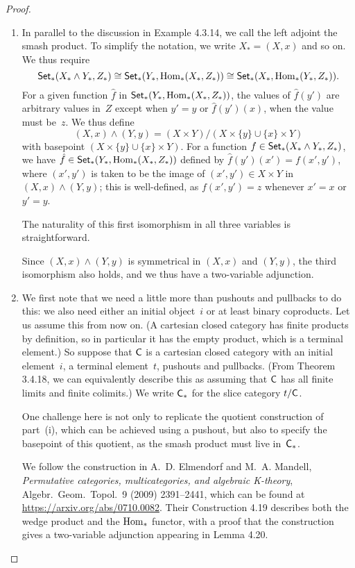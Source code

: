\documentclass[../../solutions]{subfiles}
\begin{document}
\begin{proof}
  \begin{enumerate}[label=(\roman*)]
  \item In parallel to the discussion in Example 4.3.14, we call the
    left adjoint the smash product.  To simplify the notation, we
    write $X_*=(X,x)$ and so on.  We thus require
    $$\mathsf{Set}_*(X_*\wedge Y_*,Z_*) \cong \mathsf{Set}_*(Y_*, \operatorname{Hom}_*(X_*,Z_*)) \cong
    \mathsf{Set}_*(X_*, \operatorname{Hom}_*(Y_*,Z_*)).$$
    For a given function $\hat{f}$ in $\mathsf{Set}_*(Y_*, \operatorname{Hom}_*(X_*,Z_*))$,
    the values of $\hat{f}(y')$ are arbitrary values in~$Z$ except when
    $y'=y$ or $\hat{f}(y')(x)$, when the value must be~$z$.  We thus
    define
    $$(X,x)\wedge (Y,y) = (X\times Y)/(X\times\{y\}\cup \{x\}\times
    Y)$$
    with basepoint $(X\times\{y\}\cup \{x\}\times Y)$.  For a function
    $f\in\mathsf{Set}_*(X_*\wedge Y_*, Z_*)$, we have $\hat{f}\in \mathsf{Set}_*(Y_*,
    \operatorname{Hom}_*(X_*,Z_*))$ defined by $\hat{f}(y')(x') = f(x',y')$, where
    $(x',y')$ is taken to be the image of $(x',y')\in X\times Y$ in
    $(X,x)\wedge (Y,y)$; this is well-defined, as $f(x',y')=z$
    whenever $x'=x$ or $y'=y$.

    The naturality of this first isomorphism in all three variables is
    straightforward.

    Since $(X,x)\wedge(Y,y)$ is symmetrical in $(X,x)$ and $(Y,y)$,
    the third isomorphism also holds, and we thus have a two-variable
    adjunction.

  \item We first note that we need a little more than pushouts and
    pullbacks to do this: we also need either an initial object~$i$ or
    at least binary coproducts.  Let us assume this from now on.  (A
    cartesian closed category has finite products by definition, so in
    particular it has the empty product, which is a terminal element.)
    So suppose that ${\mathsf{C}}$ is a cartesian closed category with an
    initial element~$i$, a terminal element~$t$, pushouts and
    pullbacks.  (From Theorem 3.4.18, we can equivalently describe
    this as assuming that ${\mathsf{C}}$ has all finite limits and finite
    colimits.)  We write ${\mathsf{C}}_*$ for the slice category $t/{\mathsf{C}}$.

    One challenge here is not only to replicate the quotient
    construction of part~(i), which can be achieved using a pushout,
    but also to specify the basepoint of this quotient, as the smash
    product must live in~${\mathsf{C}}_*$.

    We follow the construction in A.~D. Elmendorf and M.~A. Mandell,
    \emph{Permutative categories, multicategories, and algebraic
      K-theory}, Algebr.\ Geom.\ Topol.\ 9 (2009) 2391--2441, which
    can be found at \url{https://arxiv.org/abs/0710.0082}.  Their
    Construction 4.19 describes both the wedge product and the
    $\operatorname{Hom}_*$ functor, with a proof that the construction gives a
    two-variable adjunction appearing in Lemma 4.20.


\end{enumerate}
\end{proof}
\end{document}
